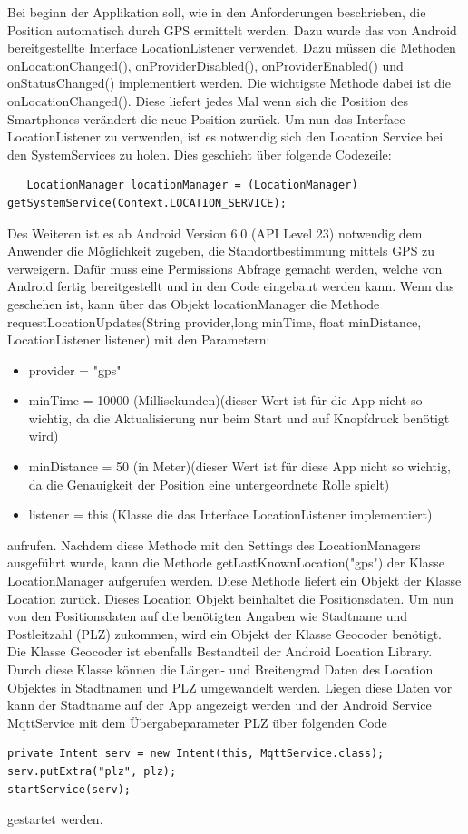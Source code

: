 Bei beginn der Applikation soll, wie in den Anforderungen beschrieben, die Position automatisch durch GPS ermittelt werden. Dazu wurde das von Android bereitgestellte Interface LocationListener verwendet. Dazu müssen die Methoden onLocationChanged(), onProviderDisabled(), onProviderEnabled() und onStatusChanged() implementiert werden. 
Die wichtigste Methode dabei ist die onLocationChanged(). Diese liefert jedes Mal wenn sich die Position des Smartphones verändert die neue Position zurück. 
Um nun das Interface LocationListener zu verwenden, ist es notwendig sich den Location Service bei den SystemServices zu holen. Dies geschieht über folgende Codezeile:
  \begin{lstlisting}
   LocationManager locationManager = (LocationManager) getSystemService(Context.LOCATION_SERVICE);
  \end{lstlisting}
  Des Weiteren ist es ab Android Version 6.0 (API Level 23) notwendig dem Anwender die Möglichkeit zugeben, die Standortbestimmung mittels GPS zu verweigern. Dafür muss eine Permissions Abfrage gemacht werden, welche von Android fertig bereitgestellt und in den Code eingebaut werden kann. Wenn das geschehen ist, kann über das Objekt locationManager die Methode requestLocationUpdates(String provider,long minTime, float minDistance, LocationListener listener) mit den Parametern: 
    \begin{itemize}
\item provider = "gps"
\item minTime = 10000 (Millisekunden)(dieser Wert ist für die App nicht so wichtig, da die Aktualisierung nur beim Start und auf Knopfdruck benötigt wird)
\item minDistance = 50 (in Meter)(dieser Wert ist für diese App nicht so wichtig, da die Genauigkeit der Position eine untergeordnete Rolle spielt)
\item listener = this (Klasse die das Interface LocationListener implementiert)
\end{itemize}  
aufrufen. Nachdem diese Methode mit den Settings des LocationManagers ausgeführt wurde, kann die Methode getLastKnownLocation("gps") der Klasse LocationManager aufgerufen werden. Diese Methode liefert ein Objekt der Klasse Location zurück. Dieses Location Objekt beinhaltet die Positionsdaten. Um nun von den Positionsdaten auf die benötigten Angaben wie Stadtname und Postleitzahl (PLZ) zukommen, wird ein Objekt der Klasse Geocoder benötigt. Die Klasse Geocoder ist ebenfalls Bestandteil der Android Location Library. Durch diese Klasse können die Längen- und Breitengrad Daten des Location Objektes in Stadtnamen und PLZ umgewandelt werden.
Liegen diese Daten vor kann der Stadtname auf der App angezeigt werden und der Android Service MqttService mit dem Übergabeparameter PLZ über folgenden Code 
 \begin{lstlisting}
private Intent serv = new Intent(this, MqttService.class);
serv.putExtra("plz", plz); 
startService(serv);
  \end{lstlisting}
gestartet werden.
